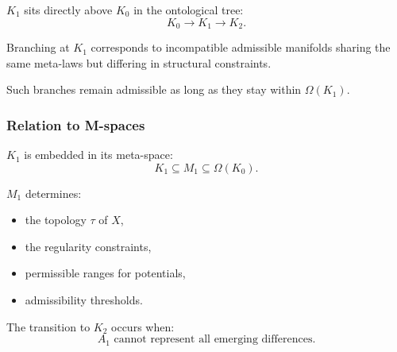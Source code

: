 $K_1$ sits directly above $K_0$ in the ontological tree:
\[
K_0 \to K_1 \to K_2.
\]

Branching at $K_1$ corresponds to incompatible admissible manifolds
sharing the same meta-laws but differing in structural constraints.

Such branches remain admissible as long as they stay within $\Omega(K_1)$.

\subsubsection{Relation to M-spaces}

$K_1$ is embedded in its meta-space:
\[
K_1 \subseteq M_1 \subseteq \Omega(K_0).
\]

$M_1$ determines:
\begin{itemize}
    \item the topology $\tau$ of $X$,
    \item the regularity constraints,
    \item permissible ranges for potentials,
    \item admissibility thresholds.
\end{itemize}

The transition to $K_2$ occurs when:
\[
A_1 \text{ cannot represent all emerging differences.}
\]
